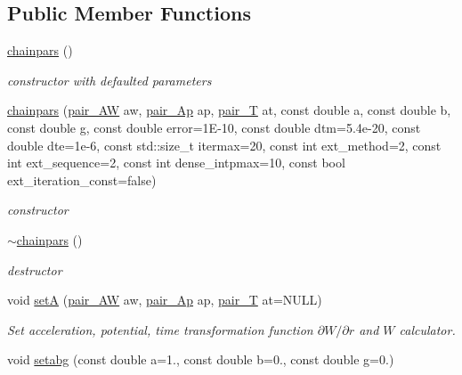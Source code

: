 \subsection*{Public Member Functions}
\begin{DoxyCompactItemize}
\item 
\hyperlink{classARC_1_1chainpars_a3b9f6e4a5a3b955b809c2c2818ea05b5}{chainpars} ()
\begin{DoxyCompactList}\small\item\em constructor with defaulted parameters \end{DoxyCompactList}\item 
\hyperlink{classARC_1_1chainpars_a95a143e04a37f662632330135842f1a6}{chainpars} (\hyperlink{classARC_1_1chainpars_a9558124278a55c0301642e1df63be063}{pair\+\_\+\+AW} aw, \hyperlink{classARC_1_1chainpars_a80fcc6e3b5ce69025126bc49d90f233c}{pair\+\_\+\+Ap} ap, \hyperlink{classARC_1_1chainpars_a860194e916f3ae900e93beedd277fa3c}{pair\+\_\+T} at, const double a, const double b, const double g, const double error=1\+E-\/10, const double dtm=5.\+4e-\/20, const double dte=1e-\/6, const std\+::size\+\_\+t itermax=20, const int ext\+\_\+method=2, const int ext\+\_\+sequence=2, const int dense\+\_\+intpmax=10, const bool ext\+\_\+iteration\+\_\+const=false)
\begin{DoxyCompactList}\small\item\em constructor \end{DoxyCompactList}\item 
\hyperlink{classARC_1_1chainpars_a297d217331fa2662d1e5e4471710a0f8}{$\sim$chainpars} ()
\begin{DoxyCompactList}\small\item\em destructor \end{DoxyCompactList}\item 
void \hyperlink{classARC_1_1chainpars_a8fb0855614ac2b2e527c43ce5d66ca0d}{setA} (\hyperlink{classARC_1_1chainpars_a9558124278a55c0301642e1df63be063}{pair\+\_\+\+AW} aw, \hyperlink{classARC_1_1chainpars_a80fcc6e3b5ce69025126bc49d90f233c}{pair\+\_\+\+Ap} ap, \hyperlink{classARC_1_1chainpars_a860194e916f3ae900e93beedd277fa3c}{pair\+\_\+T} at=N\+U\+LL)
\begin{DoxyCompactList}\small\item\em Set acceleration, potential, time transformation function $\partial W/\partial r$ and $W$ calculator. \end{DoxyCompactList}\item 
void \hyperlink{classARC_1_1chainpars_ae0c990967c66e1d2a4ce2a0b11e98a1b}{setabg} (const double a=1., const double b=0., const double g=0.)

\end{DoxyCompactItemize}

